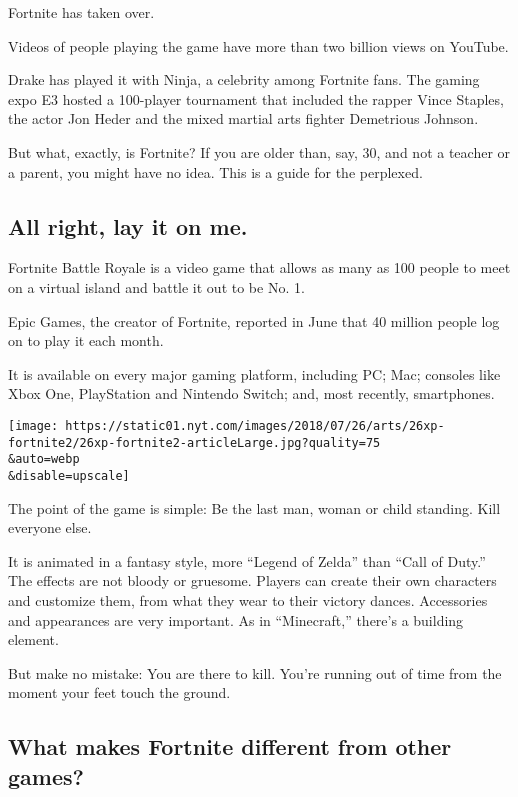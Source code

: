 Fortnite has taken over.

Videos of people playing the game have more than two billion views on
YouTube.

Drake has played it with Ninja, a celebrity among Fortnite fans. The
gaming expo E3 hosted a 100-player tournament that included the rapper
Vince Staples, the actor Jon Heder and the mixed martial arts fighter
Demetrious Johnson.

But what, exactly, is Fortnite? If you are older than, say, 30, and not
a teacher or a parent, you might have no idea. This is a guide for the
perplexed.

\hypertarget{all-right-lay-it-on-me}{%
\subsection{All right, lay it on me.}\label{all-right-lay-it-on-me}}

Fortnite Battle Royale is a video game that allows as many as 100 people
to meet on a virtual island and battle it out to be No. 1.

Epic Games, the creator of Fortnite, reported in June that 40 million
people log on to play it each month.

It is available on every major gaming platform, including PC; Mac;
consoles like Xbox One, PlayStation and Nintendo Switch; and, most
recently, smartphones.

\texttt{[image: https://static01.nyt.com/images/2018/07/26/arts/26xp-fortnite2/26xp-fortnite2-articleLarge.jpg?quality=75\\\&auto=webp\\\&disable=upscale]}

The point of the game is simple: Be the last man, woman or child
standing. Kill everyone else.

It is animated in a fantasy style, more ``Legend of Zelda'' than ``Call
of Duty.'' The effects are not bloody or gruesome. Players can create
their own characters and customize them, from what they wear to their
victory dances. Accessories and appearances are very important. As in
``Minecraft,'' there's a building element.

But make no mistake: You are there to kill. You're running out of time
from the moment your feet touch the ground.

\hypertarget{what-makes-fortnite-different-from-other-games}{%
\subsection{What makes Fortnite different from other
games?}\label{what-makes-fortnite-different-from-other-games}}

